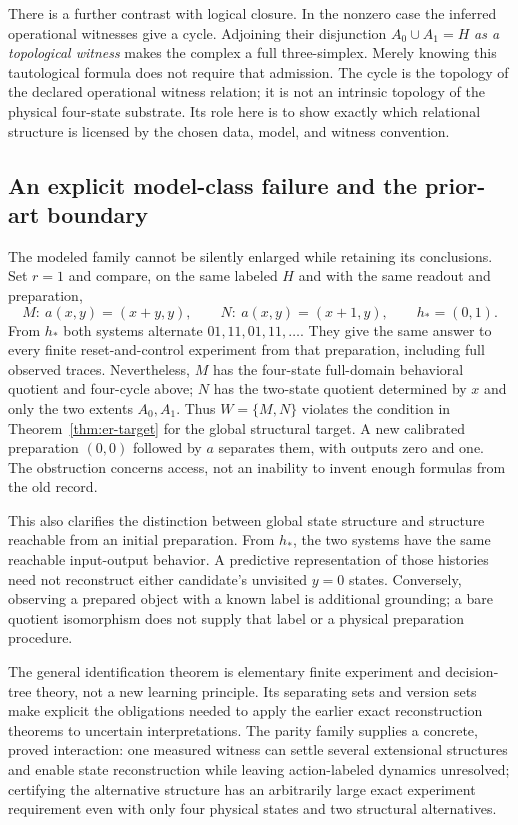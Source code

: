 \documentclass[11pt]{article}
\theoremstyle{definition}
\begin{document}
There is a further contrast with logical closure. In the nonzero case the
inferred operational witnesses give a cycle. Adjoining their disjunction
$A_0\cup A_1=H$ \emph{as a topological witness} makes the complex a full
three-simplex. Merely knowing this tautological formula does not require
that admission. The cycle is the topology of the declared operational
witness relation; it is not an intrinsic topology of the physical four-state
substrate. Its role here is to show exactly which relational structure is
licensed by the chosen data, model, and witness convention.

\subsection{An explicit model-class failure and the prior-art boundary}

The modeled family cannot be silently enlarged while retaining its
conclusions. Set $r=1$ and compare, on the same labeled $H$ and with the
same readout and preparation,
\[
 M:\ a(x,y)=(x+y,y),\qquad
 N:\ a(x,y)=(x+1,y),\qquad h_*=(0,1).
\]
From $h_*$ both systems alternate $01,11,01,11,\ldots$. They give the
same answer to every finite reset-and-control experiment from that
preparation, including full observed traces. Nevertheless, $M$ has the
four-state full-domain behavioral quotient and four-cycle above; $N$ has
the two-state quotient determined by $x$ and only the two extents $A_0,A_1$.
Thus $W=\{M,N\}$ violates the condition in
Theorem~\ref{thm:er-target} for the global structural target.
A new calibrated preparation $(0,0)$ followed by $a$ separates them, with
outputs zero and one. The obstruction concerns access, not an inability to
invent enough formulas from the old record.

This also clarifies the distinction between global state structure and
structure reachable from an initial preparation. From $h_*$, the two
systems have the same reachable input-output behavior. A predictive
representation of those histories need not reconstruct either candidate's
unvisited $y=0$ states. Conversely, observing a prepared object with a
known label is additional grounding; a bare quotient isomorphism does not
supply that label or a physical preparation procedure.

The general identification theorem is elementary finite experiment and
decision-tree theory, not a new learning principle. Its separating sets
and version sets make explicit the obligations needed to apply the earlier
exact reconstruction theorems to uncertain interpretations. The parity
family supplies a concrete, proved interaction: one measured witness can
settle several extensional structures and enable state reconstruction while
leaving action-labeled dynamics unresolved; certifying the alternative
structure has an arbitrarily large exact experiment requirement even with
only four physical states and two structural alternatives.
\end{document}
